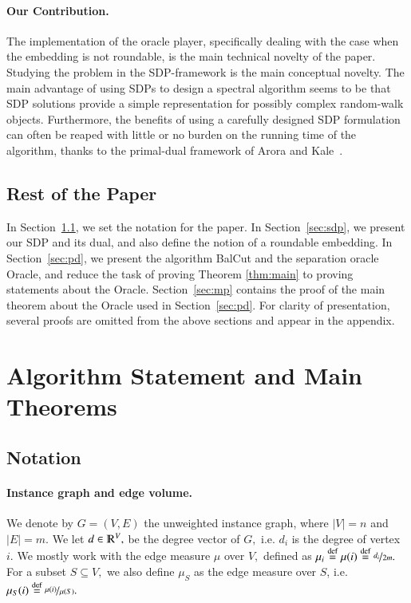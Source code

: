 \documentclass[twoside,leqno,twocolumn]{article}
\newcommand{\nfrac}{\nicefrac}
\renewcommand{\mathbb}{\varmathbb}
\newcommand{\abs}[1]{\lvert#1\rvert}
\newcommand{\defeq}{\stackrel{\textup{def}}{=}}
\newcommand{\R}{\mathbb R}
\newcommand{\card}{\abs}
\newcommand{\SDP}{{\sf SDP}\xspace}
\numberwithin{equation}{section}
\begin{document}
\paragraph{Our Contribution.}
The implementation of the oracle player, specifically dealing with the case when the embedding is not roundable,   is the main technical novelty of the paper. Studying the problem in the SDP-framework is the main conceptual novelty. 
The main advantage of using {\SDP}s to design a spectral algorithm seems to be that {\SDP} solutions provide a  simple representation for possibly complex random-walk objects. 
Furthermore, the benefits of using a carefully designed {\SDP} formulation can often  be reaped with little or no burden on the running time of the algorithm, thanks to the primal-dual framework of Arora and Kale~\cite{AK}.  


\subsection{Rest of the Paper}
In Section~\ref{sec:notation}, we set the notation for the paper. In Section~\ref{sec:sdp},  we present our {\SDP} and its dual, and also define the notion of a roundable embedding. In Section~\ref{sec:pd},  we present the algorithm {\sc BalCut} and the separation oracle {\sc Oracle}, and reduce the task of  proving  Theorem \ref{thm:main} to proving statements about the {\sc Oracle}. Section~\ref{sec:mp} contains the proof of the main theorem about the {\sc Oracle} used in Section~\ref{sec:pd}.  For clarity of presentation, several proofs are omitted from the above sections and appear in the appendix. 


\section{Algorithm Statement and Main Theorems}



\subsection{Notation} \label{sec:notation}


\paragraph{Instance graph and edge volume.} We denote by $G=(V,E)$ the unweighted instance graph, where $\card{V} = n$ and $\card{E}=m.$ We let $d \in \R^V,$ be the degree vector of $G,$ i.e. $d_i$ is the degree of vertex $i.$ We mostly work with the edge measure $\mu$ over $V,$ defined as $\mu_i \defeq \mu(i) \defeq \nfrac{d_i}{2m}.$ For a subset $ S \subseteq V,$ we also define $\mu_S$ as the edge measure over $S$, i.e. $\mu_S(i) \defeq \nfrac{\mu(i)}{\mu(S)}.$
\end{document}
